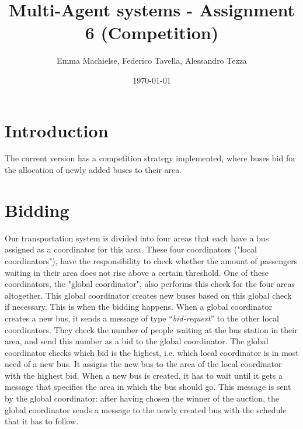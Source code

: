 \documentclass[a4paper]{article}
\title{Multi-Agent systems - Assignment 6 (Competition)}
\author{Emma Machielse, Federico Tavella, Alessandro Tezza}
\date{\today}
\begin{document}
\maketitle

\section{Introduction}
The current version has a competition strategy implemented, where buses bid for the allocation of newly added buses to their area.

\section{Bidding} 

Our transportation system is divided into four areas that each have a bus assigned as a coordinator for this area. These four coordinators ("local coordinators"), have the responsibility to check whether the amount of passengers waiting in their area does not rise above a certain threshold. One of these coordinators, the "global coordinator", also performs this check for the four areas altogether. This global coordinator creates new buses based on this global check if necessary. 
\newline
This is when the bidding happens. When a global coordinator creates a new bus, it sends a message of type ``\textit{bid-request}'' to the other local coordinators. They check the number of people waiting at the bus station in their area, and send this number as a bid to the global coordinator. The global coordinator checks which bid is the highest, i.e. which local coordinator is in most need of a new bus. It assigns the new bus to the area of the local coordinator with the highest bid. 
\newline
When a new bus is created, it has to wait until it gets a message that specifies the area in which the bus should go. This message is sent by the global coordinator: after having chosen the winner of the auction, the global coordinator sends a message to the newly created bus with the schedule that it has to follow.
\end{document}
